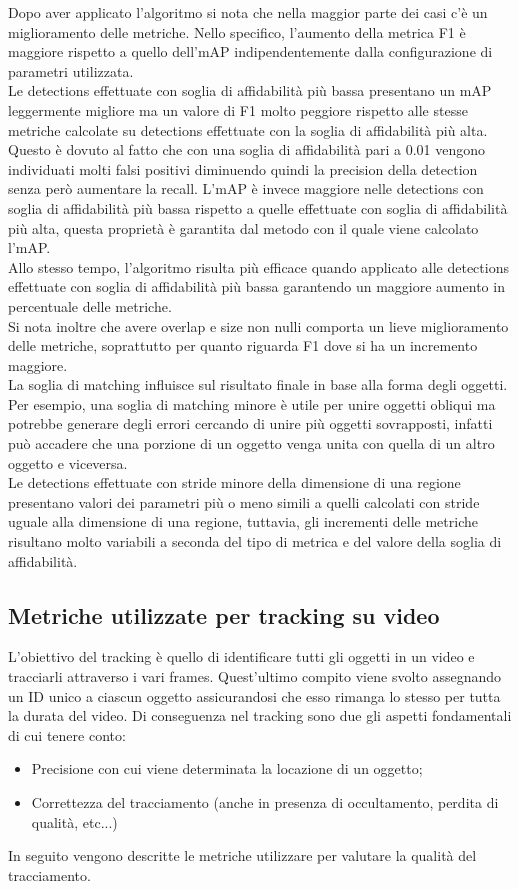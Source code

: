 Dopo aver applicato l'algoritmo si nota che nella maggior parte dei casi c'è un miglioramento delle metriche. Nello specifico, l'aumento della metrica F1 è maggiore rispetto a quello dell'mAP indipendentemente dalla configurazione di parametri utilizzata.\\
Le detections effettuate con soglia di affidabilità più bassa presentano un mAP leggermente migliore ma un valore di F1 molto peggiore rispetto alle stesse metriche calcolate su detections effettuate con la soglia di affidabilità più alta. Questo è dovuto al fatto che con una soglia di affidabilità pari a 0.01 vengono individuati molti falsi positivi diminuendo quindi la precision della detection senza però aumentare la recall. L'mAP è invece maggiore nelle detections con soglia di affidabilità più bassa rispetto a quelle effettuate con soglia di affidabilità più alta, questa proprietà è garantita dal metodo con il quale viene calcolato l'mAP.\\
Allo stesso tempo, l'algoritmo risulta più efficace quando applicato alle detections effettuate con soglia di affidabilità più bassa garantendo un maggiore aumento in percentuale delle metriche.\\
Si nota inoltre che avere overlap e size non nulli comporta un lieve miglioramento delle metriche, soprattutto per quanto riguarda F1 dove si ha un incremento maggiore.\\
La soglia di matching influisce sul risultato finale in base alla forma degli oggetti. Per esempio, una soglia di matching minore è utile per unire oggetti obliqui ma potrebbe generare degli errori cercando di unire più oggetti sovrapposti, infatti può accadere che una porzione di un oggetto venga unita con quella di un altro oggetto e viceversa.\\
Le detections effettuate con stride minore della dimensione di una regione presentano valori dei parametri più o meno simili a quelli calcolati con stride uguale alla dimensione di una regione, tuttavia,  gli incrementi delle metriche risultano molto variabili a seconda del tipo di metrica e del valore della soglia di affidabilità.


\subsection{Metriche utilizzate per tracking su video}
L'obiettivo del tracking è quello di identificare tutti gli oggetti in un video e tracciarli attraverso i vari frames. Quest'ultimo compito viene svolto assegnando un ID unico a ciascun oggetto assicurandosi che esso rimanga lo stesso per tutta la durata del video. Di conseguenza nel tracking sono due gli aspetti fondamentali di cui tenere conto:
\begin{itemize}
\item Precisione con cui viene determinata la locazione di un oggetto;
\item Correttezza del tracciamento (anche in presenza di occultamento, perdita di qualità, etc...)
\end{itemize}
In seguito vengono descritte le metriche utilizzare per valutare la qualità del tracciamento.

